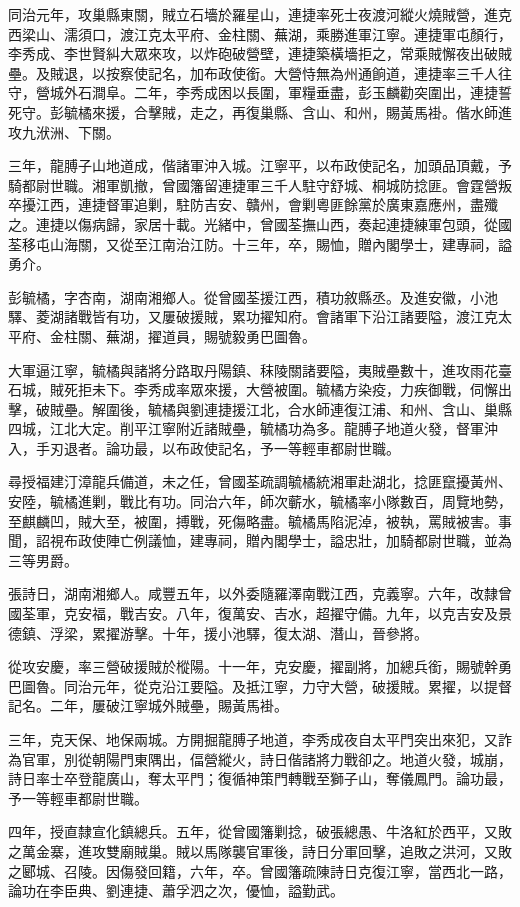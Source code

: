 \begin{pinyinscope}
同治元年，攻巢縣東關，賊立石墻於羅星山，連捷率死士夜渡河縱火燒賊營，進克西梁山、濡須口，渡江克太平府、金柱關、蕪湖，乘勝進軍江寧。連捷軍屯顏行，李秀成、李世賢糾大眾來攻，以炸砲破營壁，連捷築橫墻拒之，常乘賊懈夜出破賊壘。及賊退，以按察使記名，加布政使銜。大營恃無為州通餉道，連捷率三千人往守，營城外石澗阜。二年，李秀成困以長圍，軍糧垂盡，彭玉麟勸突圍出，連捷誓死守。彭毓橘來援，合擊賊，走之，再復巢縣、含山、和州，賜黃馬褂。偕水師進攻九洑洲、下關。

三年，龍膊子山地道成，偕諸軍沖入城。江寧平，以布政使記名，加頭品頂戴，予騎都尉世職。湘軍凱撤，曾國籓留連捷軍三千人駐守舒城、桐城防捻匪。會霆營叛卒擾江西，連捷督軍追剿，駐防吉安、贛州，會剿粵匪餘黨於廣東嘉應州，盡殲之。連捷以傷病歸，家居十載。光緒中，曾國荃撫山西，奏起連捷練軍包頭，從國荃移屯山海關，又從至江南治江防。十三年，卒，賜恤，贈內閣學士，建專祠，謚勇介。

彭毓橘，字杏南，湖南湘鄉人。從曾國荃援江西，積功敘縣丞。及進安徽，小池驛、菱湖諸戰皆有功，又屢破援賊，累功擢知府。會諸軍下沿江諸要隘，渡江克太平府、金柱關、蕪湖，擢道員，賜號毅勇巴圖魯。

大軍逼江寧，毓橘與諸將分路取丹陽鎮、秣陵關諸要隘，夷賊壘數十，進攻雨花臺石城，賊死拒未下。李秀成率眾來援，大營被圍。毓橘方染疫，力疾御戰，伺懈出擊，破賊壘。解圍後，毓橘與劉連捷援江北，合水師連復江浦、和州、含山、巢縣四城，江北大定。削平江寧附近諸賊壘，毓橘功為多。龍膊子地道火發，督軍沖入，手刃退者。論功最，以布政使記名，予一等輕車都尉世職。

尋授福建汀漳龍兵備道，未之任，曾國荃疏調毓橘統湘軍赴湖北，捻匪竄擾黃州、安陸，毓橘進剿，戰比有功。同治六年，師次蘄水，毓橘率小隊數百，周覽地勢，至麒麟凹，賊大至，被圍，搏戰，死傷略盡。毓橘馬陷泥淖，被執，罵賊被害。事聞，詔視布政使陣亡例議恤，建專祠，贈內閣學士，謚忠壯，加騎都尉世職，並為三等男爵。

張詩日，湖南湘鄉人。咸豐五年，以外委隨羅澤南戰江西，克義寧。六年，改隸曾國荃軍，克安福，戰吉安。八年，復萬安、吉水，超擢守備。九年，以克吉安及景德鎮、浮梁，累擢游擊。十年，援小池驛，復太湖、潛山，晉參將。

從攻安慶，率三營破援賊於樅陽。十一年，克安慶，擢副將，加總兵銜，賜號幹勇巴圖魯。同治元年，從克沿江要隘。及抵江寧，力守大營，破援賊。累擢，以提督記名。二年，屢破江寧城外賊壘，賜黃馬褂。

三年，克天保、地保兩城。方開掘龍膊子地道，李秀成夜自太平門突出來犯，又詐為官軍，別從朝陽門東隅出，偪營縱火，詩日偕諸將力戰卻之。地道火發，城崩，詩日率士卒登龍廣山，奪太平門；復循神策門轉戰至獅子山，奪儀鳳門。論功最，予一等輕車都尉世職。

四年，授直隸宣化鎮總兵。五年，從曾國籓剿捻，破張總愚、牛洛紅於西平，又敗之萬金寨，進攻雙廟賊巢。賊以馬隊襲官軍後，詩日分軍回擊，追敗之洪河，又敗之郾城、召陵。因傷發回籍，六年，卒。曾國籓疏陳詩日克復江寧，當西北一路，論功在李臣典、劉連捷、蕭孚泗之次，優恤，謚勤武。


\end{pinyinscope}
